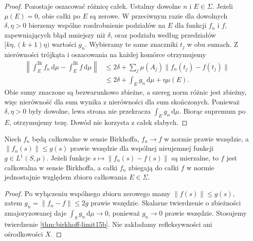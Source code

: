 \begin{proof}
Pozostaje oszacować różnicę całek. Ustalmy dowolne
$n$ i $E\in\Sigma$. Jeżeli $\mu(E)=0$, obie całki
po $E$ są zerowe. W przeciwnym razie dla dowolnych
$\delta,\eta>0$ bierzemy wspólne rozdrobnienie podziałów
na $E$ dla funkcji $f_n$ i $f$, zapewniających błąd
mniejszy niż $\delta$, oraz podziału według przedziałów
$[k\eta,(k+1)\eta)$ wartości $g_n$.
Wybieramy te same znaczniki $t_j$ w obu sumach.
Z nierówności trójkąta i oszacowania na każdej komórce
otrzymujemy
\[
 \begin{aligned}
 \left\|\int_E^{\mathrm{Bi}}f_n\,\mathrm d\mu
       -\int_E^{\mathrm{Bi}}f\,\mathrm d\mu\right\|
 &\le 2\delta+\sum_j\mu(A_j)\|f_n(t_j)-f(t_j)\|\\
 &\le 2\delta+\int_E g_n\,\mathrm d\mu+\eta\mu(E).
 \end{aligned}
\]
Obie sumy znaczone są bezwarunkowo zbieżne, a szereg
norm różnic jest zbieżny, więc nierówność dla sum
wynika z nierówności dla sum skończonych.
Ponieważ $\delta,\eta>0$ były dowolne, lewa strona
nie przekracza $\int_E g_n\,\mathrm d\mu$.
Biorąc supremum po $E$, otrzymujemy tezę.
Dowód nie korzysta z całek słabych.
\end{proof}

\begin{wniosek}
\label{cor:birkhoff-dct15b}
Niech $f_n$ będą całkowalne w sensie Birkhoffa,
$f_n\to f$ w normie prawie wszędzie, a
$\|f_n(s)\|\le g(s)$ prawie wszędzie dla wspólnej
nieujemnej funkcji $g\in L^1(S,\mu)$.
Jeżeli funkcje $s\mapsto\|f_n(s)-f(s)\|$ są mierzalne,
to $f$ jest całkowalna w sensie Birkhoffa, a całki
$f_n$ zbiegają do całki $f$ w normie jednostajnie
względem zbioru całkowania $E\in\Sigma$.
\end{wniosek}
\begin{proof}
Po wyłączeniu wspólnego zbioru zerowego mamy
$\|f(s)\|\le g(s)$, zatem
$g_n=\|f_n-f\|\le2g$ prawie wszędzie.
Skalarne twierdzenie o zbieżności zmajoryzowanej
daje $\int_S g_n\,\mathrm d\mu\to0$, ponieważ
$g_n\to0$ prawie wszędzie.
Stosujemy twierdzenie \ref{thm:birkhoff-limit15b}.
Nie zakładamy refleksywności ani ośrodkowości $X$.
\end{proof}


